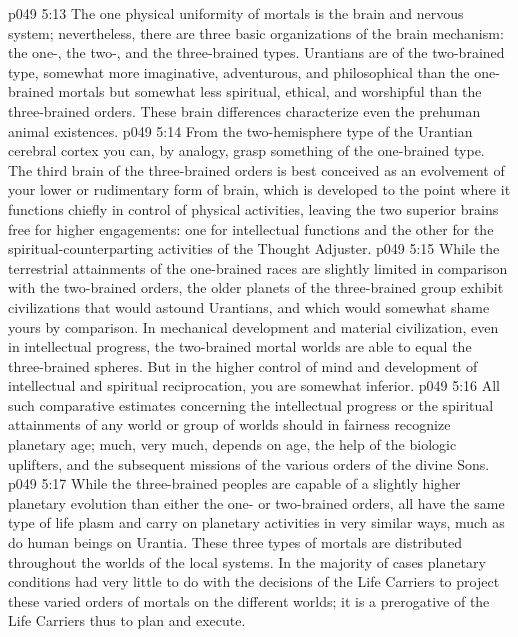 \vs p049 5:13 \bibnobreakspace {} The one physical uniformity of mortals is the brain and nervous system; nevertheless, there are three basic organizations of the brain mechanism: the one-, the two-, and the three\hyp{}brained types. Urantians are of the two\hyp{}brained type, somewhat more imaginative, adventurous, and philosophical than the one\hyp{}brained mortals but somewhat less spiritual, ethical, and worshipful than the three\hyp{}brained orders. These brain differences characterize even the prehuman animal existences.
\vs p049 5:14 From the two\hyp{}hemisphere type of the Urantian cerebral cortex you can, by analogy, grasp something of the one\hyp{}brained type. The third brain of the three\hyp{}brained orders is best conceived as an evolvement of your lower or rudimentary form of brain, which is developed to the point where it functions chiefly in control of physical activities, leaving the two superior brains free for higher engagements: one for intellectual functions and the other for the spiritual\hyp{}counterparting activities of the Thought Adjuster.
\vs p049 5:15 While the terrestrial attainments of the one\hyp{}brained races are slightly limited in comparison with the two\hyp{}brained orders, the older planets of the three\hyp{}brained group exhibit civilizations that would astound Urantians, and which would somewhat shame yours by comparison. In mechanical development and material civilization, even in intellectual progress, the two\hyp{}brained mortal worlds are able to equal the three\hyp{}brained spheres. But in the higher control of mind and development of intellectual and spiritual reciprocation, you are somewhat inferior.
\vs p049 5:16 All such comparative estimates concerning the intellectual progress or the spiritual attainments of any world or group of worlds should in fairness recognize planetary age; much, very much, depends on age, the help of the biologic uplifters, and the subsequent missions of the various orders of the divine Sons.
\vs p049 5:17 While the three\hyp{}brained peoples are capable of a slightly higher planetary evolution than either the one\hyp{} or two\hyp{}brained orders, all have the same type of life plasm and carry on planetary activities in very similar ways, much as do human beings on Urantia. These three types of mortals are distributed throughout the worlds of the local systems. In the majority of cases planetary conditions had very little to do with the decisions of the Life Carriers to project these varied orders of mortals on the different worlds; it is a prerogative of the Life Carriers thus to plan and execute.

